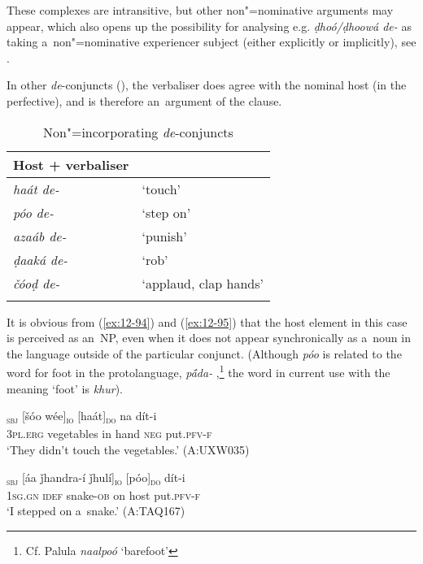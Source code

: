 These complexes are intransitive, but other non"=nominative arguments may appear, which also opens up the possibility for analysing e.g. \textit{ḍhoó/ḍhoowá de-} as taking a~non"=nominative experiencer subject (either explicitly or implicitly), see . 


 In other \textit{de}-conjuncts (), the verbaliser does agree with the nominal host (in the perfective), and is therefore an~argument of the clause. 


\begin{table}[ht]
\caption{Non"=incorporating \textit{de}-conjuncts}
\begin{tabularx}{.75\textwidth}{ l@{\hspace{45pt}} Q }
\lspbottomrule
\textbf{Host + verbaliser} &
\\\hline
\textit{haát de-} &
`touch'\\
\textit{póo de-} &
`step on'\\
\textit{azaáb de-} &
`punish'\\
\textit{ḍaaká de-} &
`rob'\\
\textit{čóoḍ de-} &
`applaud, clap hands'\\\lspbottomrule
\end{tabularx}
\label{tab:12-8}
\end{table}


It is obvious from (\ref{ex:12-94}) and (\ref{ex:12-95}) that the host element in this case is
perceived as an~NP, even when it does not appear synchronically as a~noun in the language outside of
the particular conjunct. (Although \textit{póo} is related to the word for foot in the protolanguage, \textit{p\'{\={a}}da-} \citep[8056]{turner1966},\footnote{Cf. Palula \textit{naalpoó} `barefoot'} the word in current use with the meaning `foot' is
\textit{khur}).

\begin{exe}
\ex
\label{ex:12-94}
\gll [taním]\textsubscript{\textsc{sbj}} [šóo wée]\textsubscript{\textsc{io}} [haát]\textsubscript{\textsc{do}} na dít-i \\
\textsc{3pl.erg} vegetables in hand \textsc{neg} put.\textsc{pfv-f} \\
\glt `They didn't touch the vegetables.' (A:UXW035)
\end{exe}
\begin{exe}
\ex
\label{ex:12-95}
\gll [míi]\textsubscript{\textsc{sbj}} [áa ǰhandra-í ǰhulí]\textsubscript{\textsc{io}} [póo]\textsubscript{\textsc{do}} dít-i  \\
\textsc{1sg.gn} \textsc{idef} snake-\textsc{ob} on host put.\textsc{pfv-f} \\
\glt `I stepped on a~snake.' (A:TAQ167)
\end{exe}

